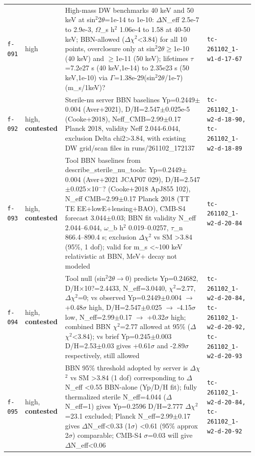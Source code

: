 \documentclass[11pt,a4paper]{article}
\begin{document}
\begin{longtable}{@{}p{}p{}p{}p{}@{}}
\texttt{f-091} & high & High-mass DW benchmarks 40 keV and 50 keV at sin$^2$2$\theta$=1e-14 to 1e-10: $\Delta$N\_eff 2.5e-7 to 2.9e-3, $\Omega$\_s h$^2$ 1.06e-4 to 1.58 at 40-50 keV; BBN-allowed ($\Delta$$\chi$$^2$\textless{}3.84) for all 10 points, overclosure only at sin$^2$2$\theta$$\geq$1e-10 (40 keV) and $\geq$1e-11 (50 keV); lifetimes $\tau$=7.2e27 s (40 keV,1e-14) to 2.35e23 s (50 keV,1e-10) via $\Gamma$=1.38e-29(sin$^2$2$\theta$/1e-7)(m\_s/1keV)? & \texttt{tc-261102\_\allowbreak{}1-w1-d-17-67} \\
\texttt{f-092} & high, \textbf{contested} & Sterile-nu server BBN baselines Yp=0.2449$\pm$0.004 (Aver+2021), D/H=2.547$\pm$0.025e-5 (Cooke+2018), Neff\_CMB=2.99$\pm$0.17 Planck 2018, validity Neff 2.044-6.044, exclusion Delta chi2\textgreater{}3.84, with existing DW grid/scan files in runs/261102\_172137 & \texttt{tc-261102\_\allowbreak{}1-w2-d-18-90,\allowbreak{} tc-261102\_\allowbreak{}1-w2-d-18-89} \\
\texttt{f-093} & high, \textbf{contested} & Tool BBN baselines from describe\_sterile\_nu\_tools: Yp=0.2449$\pm$0.004 (Aver+2021 JCAP07 029), D/H=2.547$\pm$0.025$\times$10$^-$? (Cooke+2018 ApJ855 102), N\_eff CMB=2.99$\pm$0.17 Planck 2018 (TT TE EE+lowE+lensing+BAO), CMB-S4 forecast 3.044$\pm$0.03; BBN fit validity N\_eff 2.044--6.044, $\omega$\_b h$^2$ 0.019--0.0257, $\tau$\_n 866.4--890.4 s; exclusion $\Delta$$\chi$$^2$ vs SM \textgreater{}3.84 (95\%, 1 dof); valid for m\_s \textless{}\textasciitilde{}100 keV relativistic at BBN, MeV+ decay not modeled & \texttt{tc-261102\_\allowbreak{}1-w2-d-20-84} \\
\texttt{f-094} & high, \textbf{contested} & Tool null (sin$^2$2$\theta$$\to$0) predicts Yp=0.24682, D/H$\times$10?=2.4433, N\_eff=3.0440, $\chi$$^2$=2.77, $\Delta$$\chi$$^2$=0; vs observed Yp=0.2449$\pm$0.004 $\to$ +0.48$\sigma$ high, D/H=2.547$\pm$0.025 $\to$ -4.15$\sigma$ low, N\_eff=2.99$\pm$0.17 $\to$ +0.32$\sigma$ high; combined BBN $\chi$$^2$=2.77 allowed at 95\% ($\Delta$$\chi$$^2$\textless{}3.84); vs brief Yp=0.245$\pm$0.003 D/H=2.53$\pm$0.03 gives +0.61$\sigma$ and -2.89$\sigma$ respectively, still allowed & \texttt{tc-261102\_\allowbreak{}1-w2-d-20-84,\allowbreak{} tc-261102\_\allowbreak{}1-w2-d-20-92,\allowbreak{} tc-261102\_\allowbreak{}1-w2-d-20-93} \\
\texttt{f-095} & high, \textbf{contested} & BBN 95\% threshold adopted by server is $\Delta$$\chi$$^2$ vs SM \textgreater{}3.84 (1 dof) corresponding to $\Delta$N\_eff \textless{}0.55 BBN-alone (Yp/D/H fit); fully thermalized sterile N\_eff=4.044 ($\Delta$N\_eff=1) gives Yp=0.2596 D/H=2.777 $\Delta$$\chi$$^2$=23.1 excluded; Planck N\_eff=2.99$\pm$0.17 gives $\Delta$N\_eff\textless{}0.33 (1$\sigma$) \textless{}0.61 (95\% approx 2$\sigma$) comparable; CMB-S4 $\sigma$=0.03 will give $\Delta$N\_eff\textless{}0.06 & \texttt{tc-261102\_\allowbreak{}1-w2-d-20-84,\allowbreak{} tc-261102\_\allowbreak{}1-w2-d-20-92} \\

\end{longtable}
\end{document}
